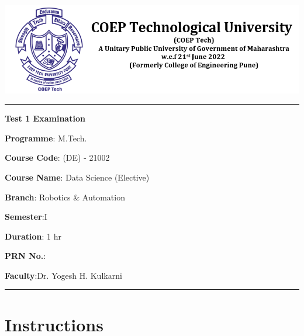 \documentclass[11pt,paper=a4]{exam}
\date{}
\begin{document}
\begin{center}
\includegraphics[width=\linewidth]{images/coep_new_logo.png}

\rule{\textwidth}{1pt}

\vspace{2ex}

{\huge{\bf {Test 1 Examination}}}
\end{center}



\thispagestyle{empty}

\begin{minipage}[t]{.5\textwidth}%
{\bf Programme}: M.Tech.\par
\vspace{1ex}
{\bf Course Code}: (DE) - 21002   \par
\vspace{1ex}
{\bf Course Name}: Data Science (Elective)\par
\vspace{1ex}
{\bf Branch}: Robotics \& Automation
\end{minipage}%
\hfill
\begin{minipage}[t]{.4\textwidth}%
{\bf Semester}:I \par
\vspace{1ex} 
{\bf Duration}: 1 hr \par
\vspace{1ex}
{\bf PRN No.}:\makebox[.5\textwidth]{\hrulefill}  \par
\vspace{1ex}
{\bf Faculty}:Dr. Yogesh H. Kulkarni
\end{minipage}

\vspace{2ex}
\rule{\textwidth}{1pt}

\section*{Instructions}

\begin{center}
\end{center}
\end{document}
